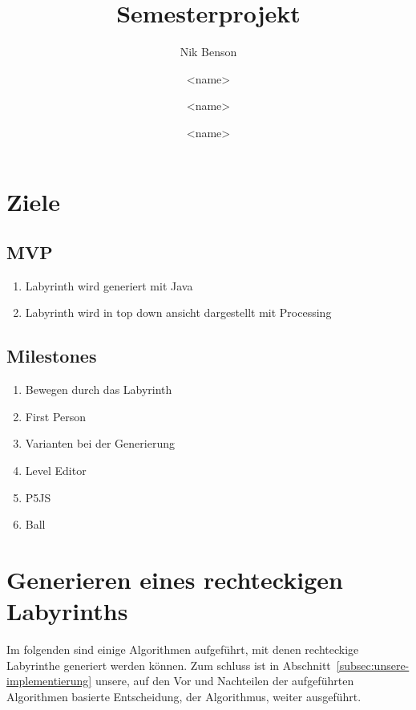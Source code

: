 \documentclass[12pt]{article}
\title{Semesterprojekt}
\author[1]{Nik Benson}
\affil[1]{\href{mailto:nik.benson@studmail.w-hs.de}{nik.benson@studmail.w-hs.de}}
\author[2]{<name>}
\affil[2]{\href{mailto:<email>}{<email>}}
\author[3]{<name>}
\affil[3]{\href{mailto:<email>}{<email>}}
\author[4]{<name>}
\affil[4]{\href{mailto:<email>}{<email>}}
\begin{document}
    

    \tableofcontents
    \newpage
    \listoffigures
    \lstlistoflistings
    \newpage


    \section{Ziele}

        \subsection{MVP}
            \begin{enumerate}
                \item Labyrinth wird generiert mit Java
                \item Labyrinth wird in top down ansicht dargestellt mit Processing
            \end{enumerate}

        \subsection{Milestones}
            \begin{enumerate}
                \item Bewegen durch das Labyrinth
                \item First Person
                \item Varianten bei der Generierung
                \item Level Editor
                \item P5JS
                \item Ball
            \end{enumerate}

    \section{Generieren eines rechteckigen Labyrinths}\label{sec:generieren-eines-rechteckigen-labyrinths}
        Im folgenden sind einige Algorithmen aufgeführt, mit denen rechteckige Labyrinthe generiert werden können.
        Zum schluss ist in Abschnitt~\ref{subsec:unsere-implementierung} unsere, auf den Vor\- und Nachteilen der aufgeführten Algorithmen basierte Entscheidung, der  Algorithmus, weiter ausgeführt.
\end{document}

